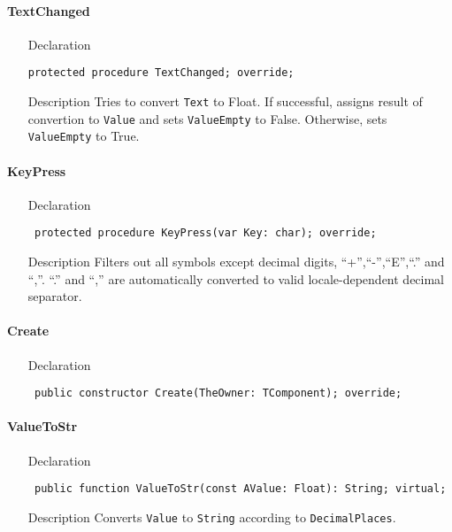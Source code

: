 \documentclass[12pt,a4paper,oneside]{report}
\newcommand{\declarationitem}[1]{{\addfontfeatures{FakeBold=1.3} #1}}
\newcommand{\descriptiontitle}[1]{{\addfontfeatures{FakeSlant}#1}}
\newcommand{\code}[1]{\texttt{#1}}
\begin{document}
\paragraph{TextChanged}\hspace*{\fill}

\label{lmnumericedits.TFloatEdit-TextChanged}
\begin{itemize}\item[\declarationitem{Declaration}\hfill]
\begin{flushleft}
\code{protected procedure TextChanged; override;}
\end{flushleft}
\item[\descriptiontitle{Description}] Tries to convert \code{Text} to Float. If successful, assigns result of convertion to \code{Value} and sets \code{ValueEmpty} to False. Otherwise, sets \code{ValueEmpty} to True.
\end{itemize}
\paragraph{KeyPress}\hspace*{\fill}
\label{lmnumericedits.TFloatEdit-KeyPress}
\begin{itemize}\item[\declarationitem{Declaration}\hfill]
\begin{flushleft}
\code{
protected procedure KeyPress(var Key: char); override;}
\end{flushleft}
\item[\descriptiontitle{Description}] Filters out all symbols except decimal digits, ``+'',``-'',``E'',``.'' and ``,''. ``.'' and ``,'' are automatically converted to valid locale-dependent decimal separator.
\end{itemize}
\paragraph{Create}\hspace*{\fill}
\label{lmnumericedits.TFloatEdit-Create}
\begin{itemize}\item[\declarationitem{Declaration}\hfill]
\begin{flushleft}
\code{
public constructor Create(TheOwner: TComponent); override;}
\end{flushleft}
\end{itemize}
\paragraph{ValueToStr}\hspace*{\fill}
\label{lmnumericedits.TFloatEdit-ValueToStr}
\begin{itemize}\item[\declarationitem{Declaration}\hfill]
\begin{flushleft}
\code{
public function ValueToStr(const AValue: Float): String; virtual;}
\end{flushleft}
\item[\descriptiontitle{Description}] Converts \code{Value} to \code{String} according to \code{DecimalPlaces}. 
\end{itemize}
\end{document}
